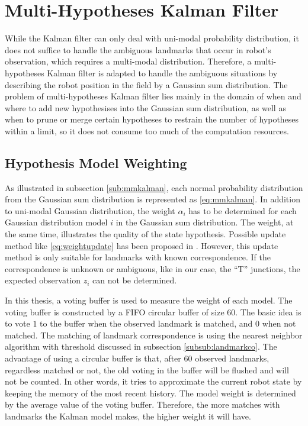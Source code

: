 \chapter{Multi-Hypotheses Kalman Filter\label{cha:chapter5}}
While the Kalman filter can only deal with uni-modal probability distribution, it does not suffice to handle the ambiguous landmarks that occur in robot's observation, which requires a multi-modal distribution. Therefore, a multi-hypotheses Kalman filter is adapted to handle the ambiguous situations by describing the robot position in the field by a Gaussian sum distribution.
The problem of multi-hypotheses Kalman filter lies mainly in the domain of when and where to add new hypothesises into the Gaussian sum distribution, as well as when to prune or merge certain hypotheses to restrain the number of hypotheses within a limit, so it does not consume too much of the computation resources.


\section{Hypothesis Model Weighting}
As illustrated in subsection \ref{sub:mmkalman}, each normal probability distribution from the Gaussian sum distribution is represented as \autoref{eq:mmkalman}. In addition to uni-modal Gaussian distribution, the weight $\alpha_i$ has to be determined for each Gaussian distribution model $i$ in the Gaussian sum distribution. The weight, at the same time, illustrates the quality of the state hypothesis. Possible update method like \autoref{eq:weightupdate} has been proposed in \cite{alspach1972nonlinear}. However, this update method is only suitable for landmarks with known correspondence. If the correspondence is unknown or ambiguous, like in our case, the ``T'' junctions, the expected observation $z\widehat{}_i$ can not be determined. 

In this thesis, a voting buffer is used to measure the weight of each model. The voting buffer is constructed by a \gls{FIFO} circular buffer of size $60$. The basic idea is to vote $1$ to the buffer when the observed landmark is matched, and $0$ when not matched. The matching of landmark correspondence is using the nearest neighbor algorithm with threshold discussed in subsection \ref{subsub:landmarkco}. 
The advantage of using a circular buffer is that, after $60$ observed landmarks, regardless matched or not, the old voting in the buffer will be flushed and will not be counted. In other words, it tries to approximate the current robot state by keeping the memory of the most recent history. The model weight is determined by the average value of the voting buffer. Therefore, the more matches with landmarks the Kalman model makes, the higher weight it will have. 


